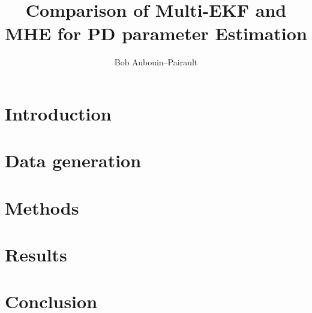 \documentclass[a4paper,12pt]{article}
\begin{document}
\title{Comparison of Multi-EKF and MHE for PD parameter Estimation}

\author{Bob Aubouin--Pairault}
\maketitle

\section{Introduction}


\section{Data generation}




\section{Methods}


\section{Results}


\section{Conclusion}



\end{document}
